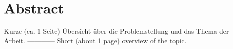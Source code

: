 \thispagestyle{plain}

\section*{Abstract}
Kurze (ca. 1 Seite) Übersicht über die Problemstellung und das Thema der Arbeit.
------------
\newline
Short (about 1 page) overview of the topic.